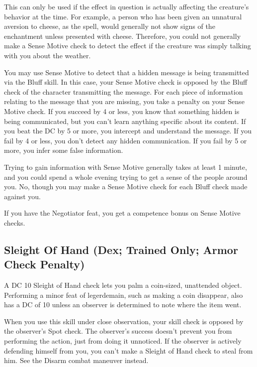 This can only be used if the effect in question is actually affecting the creature's behavior at the time. For example, a person who has been given an unnatural aversion to cheese, as the  spell, would generally not show signs of the enchantment unless presented with cheese. Therefore, you could not generally make a Sense Motive check to detect the effect if the creature was simply talking with you about the weather.

 You may use Sense Motive to detect that a hidden message is being transmitted via the Bluff skill. In this case, your Sense Motive check is opposed by the Bluff check of the character transmitting the message. For each piece of information relating to the message that you are missing, you take a  penalty on your Sense Motive check. If you succeed by 4 or less, you know that something hidden is being communicated, but you can't learn anything specific about its content. If you beat the DC by 5 or more, you intercept and understand the message. If you fail by 4 or less, you don't detect any hidden communication. If you fail by 5 or more, you infer some false information.

 Trying to gain information with Sense Motive generally takes at least 1 minute, and you could spend a whole evening trying to get a sense of the people around you.
 No, though you may make a Sense Motive check for each Bluff check made against you.
\par If you have the Negotiator feat, you get a  competence bonus on Sense
Motive checks.

\subsection{Sleight Of Hand (Dex; Trained Only; Armor Check Penalty)}
 A DC 10 Sleight of Hand check lets you palm a coin-sized, unattended object. Performing a minor feat of legerdemain, such as making a coin disappear, also has a DC of 10 unless an observer is determined to note where the item went.

When you use this skill under close observation, your skill check is opposed by the observer's Spot check. The observer's success doesn't prevent you from performing the action, just from doing it unnoticed. If the observer is actively defending himself from you, you can't make a Sleight of Hand check to steal from him. See the Disarm combat maneuver instead.

